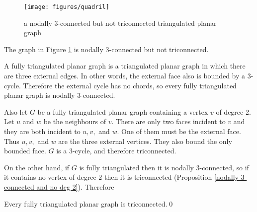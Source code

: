 \begin{figure}
\centerline{\texttt{[image: figures/quadril]}}
\caption{a nodally 3-connected but not triconnected triangulated
planar graph}
\label{quadril.fig}
\end{figure}

The graph in Figure \ref{quadril.fig} is nodally 3-connected but
not triconnected.


A fully triangulated planar graph is a triangulated planar
graph in which there are three external edges. In other words,
the external face also is bounded by a 3-cycle.  Therefore the
external cycle has no chords, so every fully triangulated
planar graph is nodally 3-connected.

Also let $G$ be a fully triangulated planar graph containing
a vertex $v$ of degree 2. Let $u$ and $w$
be the neighbours of $v$. There are only two faces
incident to $v$ and they are both incident to
$u,v,$ and $w$.  One of them must be
the external face. Thus $u,v,$ and $w$ are the
three external vertices.  They also bound
the only bounded face.  $G$ is a 3-cycle,
and therefore triconnected.

On the other hand,
if $G$ is fully triangulated
then it is nodally 3-connected,
so if it contains no vertex of degree $2$
then it is triconnected
(Proposition
\ref{nodally 3-connected and no deg 2}).  Therefore

\begin{corollary}
Every fully triangulated planar graph is triconnected.\qed
\end{corollary}

